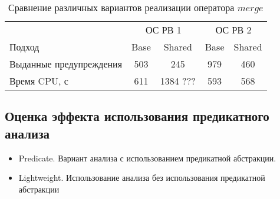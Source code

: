 \begin{center}
  \begin{table}[h]\footnotesize \centering
  	\label{table-drivers-lock-refinement}
    \caption{Сравнение различных вариантов реализации оператора $merge$}
    \begin{tabular}{ | l | c | c | c | c |  }
      \hline
      		& 			 \multicolumn{2}{|c|}{ОС РВ 1} & 	\multicolumn{2}{|c|}{ОС РВ 2}\\
      Подход         					& Base  & Shared  	& Base  & Shared 	\\ \hline
      Выданные предупреждения			& 503   & 245    	& 979   & 460  			\\ 
  	  Время CPU, с 						& 611   & 1384  ???	& 593   & 568  		\\ 
      \hline
    \end{tabular}
  \end{table}
\end{center}


\subsection{Оценка эффекта использования предикатного анализа}

\begin{itemize}
\item Predicate. Вариант анализа с использованием предикатной абстракции.
\item Lightweight. Использование анализа без использования предикатной абстракции
\end{itemize}



